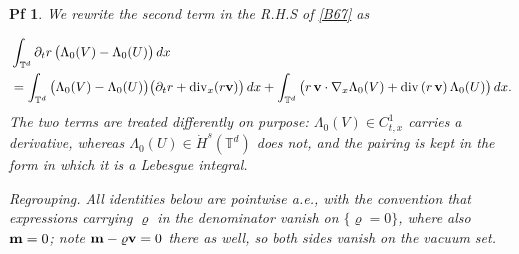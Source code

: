 \documentclass[10pt,a4paper]{amsart}
\newtheorem{pf}{Pf}
\newcommand{\Div}{\operatorname{div}}
\newcommand{\Divx}{\operatorname{div}_x}
\newcommand{\Gradx}{\nabla_x}
\newcommand{\Lambdaz}{\Lambda_0}
\newcommand{\dx}{{\,\rm d} {x}}
\newcommand{\lr}[1]{\left( #1 \right)}
\newcommand{\vc}[1]{{\bf #1}}
\newcommand{\vm}{\vc{m}}
\newcommand{\vr}{\varrho}
\newcommand{\vv}{\vc{v}}
\begin{document}
\begin{pf}
		We rewrite the second term in the R.H.S of \eqref{B67} as 

		\begin{align*}
			&	\int_{\mathbb T^d}\partial_t r\,\big(\Lambdaz(V)-\Lambdaz(U)\big) \dx \\
			&= \int_{\mathbb T^d}\big(\Lambdaz(V)-\Lambdaz(U)\big)\big(\partial_t r+\Divx(r\vv)\big) \dx
			+ \int_{\mathbb T^d}\big( r\,\vv\cdot \Gradx \Lambdaz(V)+ \Div \lr{ r\,\vv}\Lambdaz(U)\big) \dx .
		\end{align*}
The two terms are treated differently on purpose: $\Lambdaz(V)\in C^1_{t,x}$ carries a derivative, whereas $\Lambdaz(U)\in\dot H^{s}(\mathbb T^d)$ does not, and the pairing is kept in the form in which it is a Lebesgue integral.

		
	\smallskip
	
		\noindent\emph{Regrouping.} All identities below are pointwise a.e., with the convention that expressions carrying $\vr$ in the denominator vanish on $\{\vr=0\}$, where also $\vm=0$; note $\vm-\vr\vv=0$ there as well, so both sides vanish on the vacuum set. %
	

\end{pf}
\end{document}
